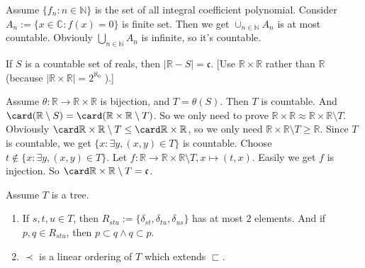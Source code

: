 \documentclass{ctexart}
\begin{document}
\begin{solution}
  Assume \(\{f_n:n \in \mathbb{N}\}\) is the set of all integral coefficient polynomial.
  Consider \(A_n:=\{x \in \mathbb{C}:f(x)=0\}\) is finite set. Then we get \(\cup_{n \in \mathbb{N}}A_n\) is at most countable. 
  Obviouly \(\bigcup_{n \in \mathbb{N} } A_n\) is infinite, so it's countable. 
\end{solution}
\begin{problem}
If $S$ is a countable set of reals, then $|\mathbb{R}-S|=\mathfrak{c}$.
[Use $\mathbb{R} \times \mathbb{R}$ rather than $\mathbb{R}$ (because $|\mathbb{R} \times \mathbb{R}|=2^{\aleph_0}$ ).]
\end{problem}

\begin{solution}
  Assume \(\theta:\mathbb{R} \to \mathbb{R} \times \mathbb{R}\) is bijection, and \(T=\theta(S)\). 
  Then \(T\) is countable. And \(\card (\mathbb{R}\setminus S)= \card (\mathbb{R} \times \mathbb{R} \setminus T)\). 
  So we only need to prove \(\mathbb{R}\times \mathbb{R} \approx \mathbb{R} \times \mathbb{R} \setminus T\). 
  Obviously \(\card \mathbb{R}\times \mathbb{R} \setminus T \leq \card \mathbb{R} \times \mathbb{R}\), so we only need
  \(\mathbb{R}\times \mathbb{R} \setminus T \geq \mathbb{R}\). 
  Since \(T\) is countable, we get \(\{x:\exists y,(x,y) \in T\}\) is countable. 
  Choose \(t \notin \{x:\exists y,(x,y) \in T\}\). 
  Let \(f:\mathbb{R} \to \mathbb{R} \times \mathbb{R} \setminus T,x \mapsto (t,x)\). 
  Easily we get \(f\) is injection. So \(\card \mathbb{R} \times \mathbb{R} \setminus T=\mathfrak{c}\). 
\end{solution}

\begin{problem}
  Assume \(T\) is a tree. 
  \begin{enumerate}
    \item If \(s,t,u \in T\), then \(R_{stu} :=\{\delta_{st} ,\delta_{tu} ,\delta_{us} \}\) has at most \(2\) elements. 
      And if \(p,q \in R_{stu}\), then \(p \subset q \wedge q \subset p\). 
    \item \(\prec \) is a linear ordering of \(T\) which extends \(\sqsubset\).  
      
  \end{enumerate}
\end{problem}
\end{document}
